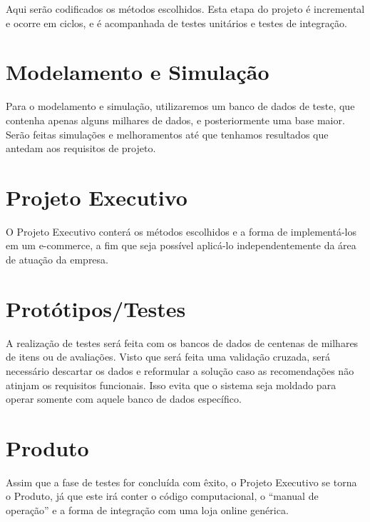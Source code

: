 Aqui serão codificados os métodos escolhidos. Esta etapa do projeto é incremental e ocorre em ciclos, e é acompanhada de testes unitários e testes de integração. 

\section{Modelamento e Simulação} %
\label{sec:modelamento_e_simula_o}


Para o modelamento e simulação, utilizaremos um banco de dados de teste, que contenha apenas alguns milhares de dados, e posteriormente uma base maior. Serão feitas simulações e melhoramentos até que tenhamos resultados que antedam aos requisitos de projeto.

\section{Projeto Executivo} %
\label{sec:projeto_executivo}


O Projeto Executivo conterá os métodos escolhidos e a forma de implementá-los em um e-commerce, a fim que seja possível aplicá-lo independentemente da área de atuação da empresa.

\section{Protótipos/Testes} %
\label{sec:prot_tipos_testes}


A realização de testes será feita com os bancos de dados de centenas de milhares de itens ou de avaliações. Visto que será feita uma validação cruzada, será necessário descartar os dados e reformular a solução caso as recomendações não atinjam os requisitos funcionais. Isso evita que o sistema seja moldado para operar somente com aquele banco de dados específico.

\section{Produto} %
\label{sec:produto}


Assim que a fase de testes for concluída com êxito, o Projeto Executivo se torna o Produto, já que este irá conter o código computacional, o ``manual de operação'' e a forma de integração com uma loja online genérica.